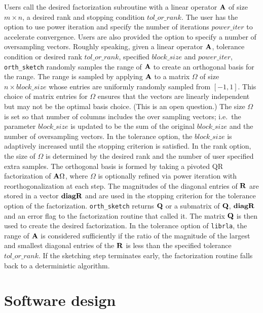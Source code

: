 \documentclass[
  12pt,
]{article}
\begin{document}
Users call the desired factorization subroutine with a linear operator
\({\bf A}\) of size \(m\times n\), a desired rank and stopping condition
\({tol\_or\_rank}\). The user has the option to use power iteration and
specify the number of iterations \(power\_iter\) to accelerate
convergence. Users are also provided the option to specify a number of
oversampling vectors. Roughly speaking, given a linear operator
\({\bf A}\), tolerance condition or desired rank \(tol\_or\_rank\),
specified \(block\_size\) and \(power\_iter\), \texttt{orth\_sketch}
randomly samples the range of \({\bf A}\) to create an orthogonal basis
for the range. The range is sampled by applying \({\bf A}\) to a matrix
\({ \Omega }\) of size \(n \times block\_size\) whose entries are
uniformly randomly sampled from \([-1,1]\). This choice of matrix
entries for \(\Omega\) ensures that the vectors are linearly independent
but may not be the optimal basis choice. (This is an open question.) The
size \(\Omega\) is set so that number of columns includes the over
sampling vectors; i.e.~the parameter \(block\_size\) is updated to be
the sum of the original \(block\_size\) and the number of oversampling
vectors. In the tolerance option, the \(block\_size\) is adaptively
increased until the stopping criterion is satisfied. In the rank option,
the size of \(\Omega\) is determined by the desired rank and the number
of user specified extra samples. The orthogonal basis is formed by
taking a pivoted QR factorization of \({\bf A}\Omega\), where \(\Omega\)
is optionally refined via power iteration with reorthogonalization at
each step. The magnitudes of the diagonal entries of \({\bf R}\) are
stored in a vector \({\bf diagR}\) and are used in the stopping
criterion for the tolerance option of the factorization.
\texttt{orth\_sketch} returns \({\bf Q}\) or a submatrix of \({\bf Q}\),
\({\bf diagR}\) and an error flag to the factorization routine that
called it. The matrix \({\bf Q}\) is then used to create the desired
factorization. In the tolerance option of \texttt{librla}, the range of
\({\bf A}\) is considered sufficiently if the ratio of the magnitude of
the largest and smallest diagonal entries of the \({\bf R}\) is less
than the specified tolerance \({tol\_or\_rank}\). If the sketching step
terminates early, the factorization routine falls back to a
deterministic algorithm.

\section{Software design}\label{software-design}
\end{document}
